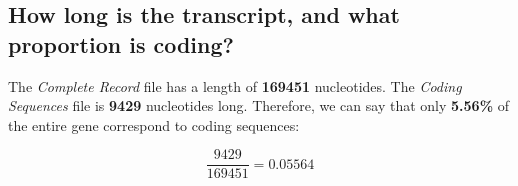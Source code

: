 
\subsection{How long is the transcript, and what proportion is coding?}

The \textit{Complete Record} file has a length of \textbf{169451} nucleotides. The \textit{Coding Sequences} file is \textbf{9429} nucleotides long. Therefore, we can say that only \textbf{5.56\%} of the entire gene correspond to coding sequences:

\[
    \frac{9429}{169451} = 0.05564
\]

\newpage

